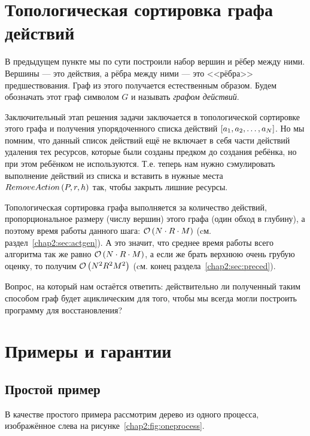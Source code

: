 \section{Топологическая сортировка графа действий}
\label{chap2:sec:topsort}

В предыдущем пункте мы по сути построили набор вершин и рёбер между ними. Вершины --- это действия, а рёбра между ними --- это <<рёбра>> предшествования. Граф из этого получается естественным образом. Будем обозначать этот граф символом $G$ и называть \emph{графом действий}.

Заключительный этап решения задачи заключается в топологической сортировке этого графа и получения упорядоченного списка действий $\left[ a_1, a_2, \ldots, a_{N} \right]$. Но мы помним, что данный список действий ещё не включает в себя части действий удаления тех ресурсов, которые были созданы предком до создания ребёнка, но при этом ребёнком не используются. Т.е. теперь нам нужно сэмулировать выполнение действий из списка и вставить в нужные места \\
$RemoveAction\left( P, r, h \right)$ так, чтобы закрыть лишние ресурсы.

Топологическая сортировка графа выполняется за количество действий, пропорциональное размеру (числу вершин) этого графа (один обход в глубину), а поэтому время работы данного шага: $\mathcal{O}\left(N \cdot R \cdot M\right)$ (cм. раздел~\ref{chap2:sec:actgen}). А это значит, что среднее время работы всего алгоритма так же равно $\mathcal{O}\left(N \cdot R \cdot M\right)$, а если же брать верхнюю очень грубую оценку, то получим $\mathcal{O}\left(N^2R^2M^2\right)$ (cм. конец раздела~\ref{chap2:sec:preced}).

Вопрос, на который нам остаётся ответить: действительно ли полученный таким способом граф будет ациклическим для того, 
чтобы мы всегда могли построить программу для восстановления?

\section{Примеры и гарантии}
\label{chap2:seq:guarantees}

\subsection{Простой пример}

В качестве простого примера рассмотрим дерево из одного процесса, изображённое слева на рисунке~\ref{chap2:fig:oneprocess}.

